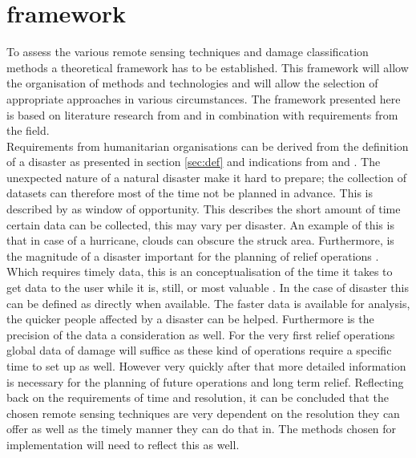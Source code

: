 \section{framework}\label{sec:framework}
To assess the various remote sensing techniques and damage classification methods a theoretical framework has to be established. This framework will allow the organisation of methods and technologies and will allow the selection of appropriate approaches in various circumstances. The framework presented here is based on literature research from \citet{Dong2013} and \citet{Kerle2008} in combination with requirements from the field.\\

Requirements from humanitarian organisations can be derived from the definition of a disaster as presented in section \ref{sec:def} and indications from \citet{AlAchkar2008} and \citet{Schweier2006}. The unexpected nature of a natural disaster make it hard to prepare; the collection of datasets can therefore most of the time not be planned in advance. This is described by \citet{Christopher2015} as window of opportunity. This describes the short amount of time certain data can be collected, this may vary per disaster. An example of this is that in case of a hurricane, clouds can obscure the struck area. Furthermore, is the magnitude of a disaster important for the planning of relief operations \citep{AlAchkar2008, Schweier2006}. Which requires timely data, this is an conceptualisation of the time it takes to get data to the user while it is, still, or most valuable \citep{Christopher2015}. In the case of disaster this can be defined as directly when available. The faster data is available for analysis, the quicker people affected by a disaster can be helped. 
Furthermore is the precision of the data a consideration as well. For the very first relief operations global data of damage will suffice as these kind of operations require a specific time to set up as well. However very quickly after that more detailed information is necessary for the planning of future operations and long term relief. Reflecting back on the requirements of time and resolution, it can be concluded that the chosen remote sensing techniques are very dependent on the resolution they can offer as well as the timely manner they can do that in. The methods chosen for implementation will need to reflect this as well.\\

